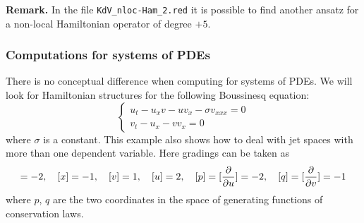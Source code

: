 \textbf{Remark.} In the file \texttt{KdV\_nloc-Ham\_2.red} it is possible to
find another ansatz for a non-local Hamiltonian operator of degree $+5$.

\subsubsection{Computations for systems of PDEs}
\label{sec:comp-syst-pdes}

There is no conceptual difference when computing for systems of PDEs. We will
look for Hamiltonian structures for the following Boussinesq equation:
\begin{equation}
  \label{cdiffeq:1}
  \left\{
  \begin{array}{l}
  u_t-u_xv-uv_x-\sigma v_{xxx}=0\\
  v_t-u_x-vv_x=0
\end{array}
\right.
\end{equation}
where $\sigma$ is a constant. This example also shows how to deal with jet
spaces with more than one dependent variable. Here gradings can be taken as
\begin{displaymath}
  [t]=-2,\quad [x]=-1,\quad [v]=1,\quad [u]=2,\quad [p]=[\pd{}{u}]=-2,\quad
  [q]=[\pd{}{v}]=-1
\end{displaymath}
where $p$, $q$ are the two coordinates in the space of generating functions of
conservation laws.

